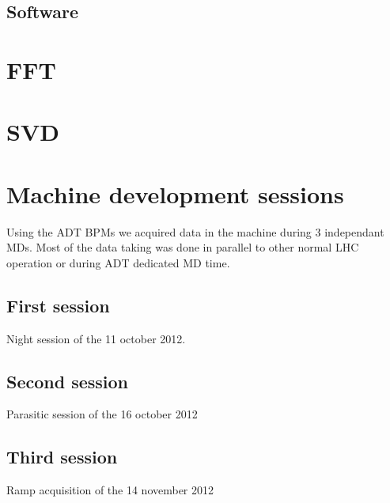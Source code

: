    \subsection{Software}

\section{FFT}

\section{SVD}

\section{Machine development sessions}

Using the \gls{ADT} \glspl{BPM} we acquired data in the machine during 3 
independant \glspl{MD}. Most of the data taking was done in parallel to 
other normal LHC operation or during \gls{ADT} dedicated \gls{MD} time.

   \subsection{First session}
   
   Night session of the 11 october 2012.

   \subsection{Second session}
   
   Parasitic session of the 16 october 2012

   \subsection{Third session}

   Ramp acquisition of the 14 november 2012

